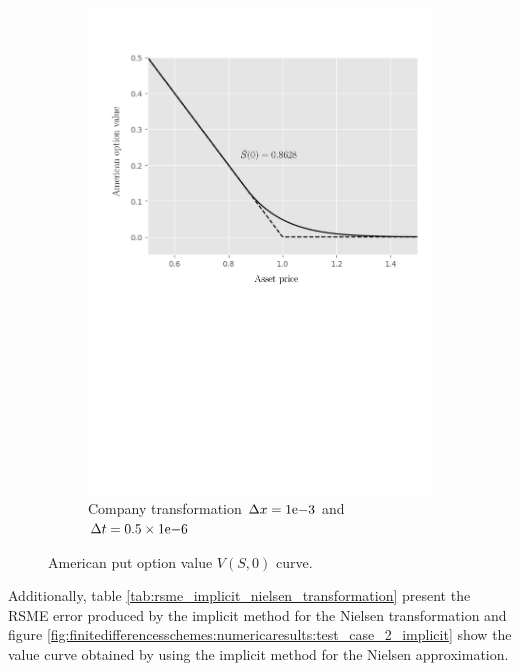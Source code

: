 \begin{figure}[H]
\begin{subfigure}{0.435\textwidth}
    \includegraphics[width=\textwidth]{chapters/chapter3/TestCase2CompanyExplicit.pdf}
    \caption{Company transformation $\Delta{x}={1}\mathrm{e}{-3}$ and $\Delta{t}=0.5\times{1}\mathrm{e}{-6}$}
  \end{subfigure}
  \caption{American put option value $V(S, 0)$ curve.}
  \label{fig:finitedifferencesschemes:numericaresults:test_case_2_explicit}
\end{figure}

Additionally, table \eqref{tab:rsme_implicit_nielsen_transformation} present the RSME error produced by the implicit method for the Nielsen transformation and figure \eqref{fig:finitedifferencesschemes:numericaresults:test_case_2_implicit} show the value curve obtained by using the implicit method for the Nielsen approximation.

